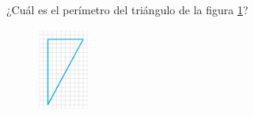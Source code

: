 ¿Cuál es el perímetro del triángulo de la figura \ref{fig:peri_rect_03}?
\begin{figure}[H]
    \centering
    \includegraphics[width=0.15\textwidth]{../images/peri_rect_03.png}
    \caption{}
    \label{fig:peri_rect_03}
\end{figure}
